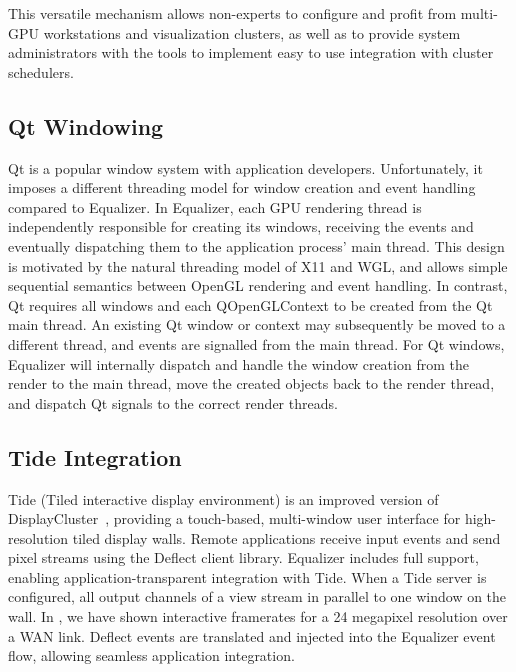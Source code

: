 \documentclass[10pt,journal,compsoc]{IEEEtran}
\begin{document}
This versatile mechanism allows non-experts to configure and profit from
multi-GPU workstations and visualization clusters, as well as to provide system
administrators with the tools to implement easy to use integration with cluster
schedulers.

\subsection{Qt Windowing}

Qt is a popular window system with application developers. Unfortunately, it
imposes a different threading model for window creation and event handling
compared to \textsf{Equalizer}. In \textsf{Equalizer}, each GPU rendering thread
is independently responsible for creating its windows, receiving the events and
eventually dispatching them to the application process' main thread. This design
is motivated by the natural threading model of X11 and WGL, and allows simple
sequential semantics between OpenGL rendering and event handling. In contrast,
Qt requires all windows and each QOpenGLContext to be created from the Qt main
thread. An existing Qt window or context may subsequently be moved to a
different thread, and events are signalled from the main thread. For Qt windows,
Equalizer will internally dispatch and handle the window creation from the
render to the main thread, move the created objects back to the render thread,
and dispatch Qt signals to the correct render threads.

\subsection{Tide Integration}

\textsf{Tide} (Tiled interactive display environment) is an improved version of
\textsf{DisplayCluster}~\cite{DC}, providing a touch-based, multi-window user
interface for high-resolution tiled display walls. Remote applications receive
input events and send pixel streams using the \textsf{Deflect} client library.
\textsf{Equalizer} includes full support, enabling application-transparent
integration with \textsf{Tide}. When a \textsf{Tide} server is configured, all
output channels of a view stream in parallel to one window on the wall. In
\cite{deflect}, we have shown interactive framerates for a 24 megapixel
resolution over a WAN link. \textsf{Deflect} events are translated and injected
into the \textsf{Equalizer} event flow, allowing seamless application
integration.
\end{document}
